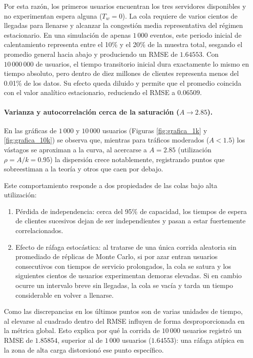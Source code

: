 \documentclass[11pt, a4paper]{article}
\begin{document}
Por esta razón, los primeros usuarios encuentran los tres servidores disponibles y no experimentan espera alguna ($T_w = 0$). La cola requiere de varios cientos de llegadas para llenarse y alcanzar la congestión media representativa del régimen estacionario. En una simulación de apenas $1\,000$ eventos, este periodo inicial de calentamiento representa entre el 10\% y el 20\% de la muestra total, sesgando el promedio general hacia abajo y produciendo un RMSE de $1.64553$. Con $10\,000\,000$ de usuarios, el tiempo transitorio inicial dura exactamente lo mismo en tiempo absoluto, pero dentro de diez millones de clientes representa menos del 0.01\% de los datos. Su efecto queda diluido y permite que el promedio coincida con el valor analítico estacionario, reduciendo el RMSE a $0.06509$.

\paragraph{Varianza y autocorrelación cerca de la saturación ($A \to 2.85$).}
En las gráficas de $1\,000$ y $10\,000$ usuarios (Figuras \ref{fig:grafica_1k} y \ref{fig:grafica_10k}) se observa que, mientras para tráficos moderados ($A < 1.5$) los vástagos se aproximan a la curva, al acercarse a $A = 2.85$ (utilización $\rho = A/k = 0.95$) la dispersión crece notablemente, registrando puntos que sobreestiman a la teoría y otros que caen por debajo.

Este comportamiento responde a dos propiedades de las colas bajo alta utilización:
\begin{enumerate}
    \item Pérdida de independencia: cerca del 95\% de capacidad, los tiempos de espera de clientes sucesivos dejan de ser independientes y pasan a estar fuertemente correlacionados.
    \item Efecto de ráfaga estocástica: al tratarse de una única corrida aleatoria sin promediado de réplicas de Monte Carlo, si por azar entran usuarios consecutivos con tiempos de servicio prolongados, la cola se satura y los siguientes cientos de usuarios experimentan demoras elevadas. Si en cambio ocurre un intervalo breve sin llegadas, la cola se vacía y tarda un tiempo considerable en volver a llenarse.
\end{enumerate}

Como las discrepancias en los últimos puntos son de varias unidades de tiempo, al elevarse al cuadrado dentro del RMSE influyen de forma desproporcionada en la métrica global. Esto explica por qué la corrida de $10\,000$ usuarios registró un RMSE de $1.85854$, superior al de $1\,000$ usuarios ($1.64553$): una ráfaga atípica en la zona de alta carga distorsionó ese punto específico.
\end{document}
